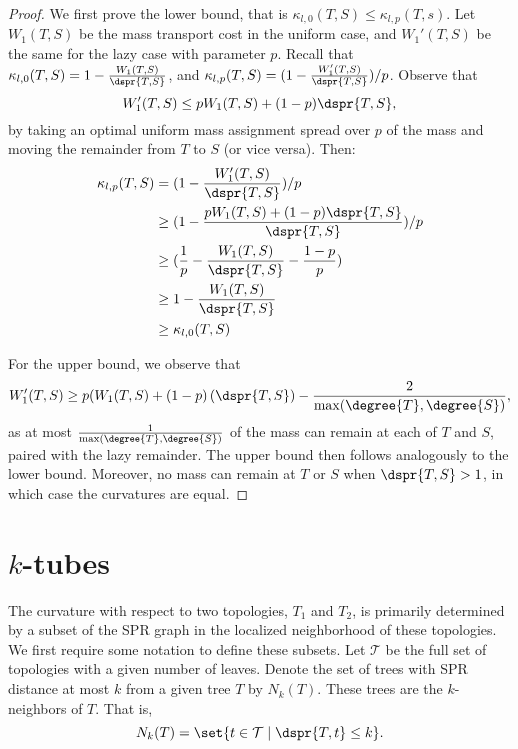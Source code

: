 \documentclass{amsart}
\newcommand{\TT}{\mathcal T}
\begin{document}
\begin{proof}
	We first prove the lower bound, that is $\kappa_{l,0}(T,S) \le \kappa_{l,p}(T,s)$.
	Let $W_1(T,S)$ be the mass transport cost in the uniform case, and $W_1'(T,S)$ be the same for the lazy case with parameter $p$.
	Recall that $\kappa_{l,0}(T,S) = 1 - \frac{W_1(T,S)}{\dspr{T,S}}$, and $\kappa_{l,p}(T,S) = (1 - \frac{W_1'(T,S)}{\dspr{T,S}}) / p$.
	Observe that $$W_1'(T,S) \le pW_1(T,S) + (1-p)\dspr{T,S},$$ by taking an optimal uniform mass assignment spread over $p$ of the mass and moving the remainder from $T$ to $S$ (or vice versa).
	Then:
	\begin{align}
		\kappa_{l,p}(T,S) &= (1 - \frac{W_1'(T,S)}{\dspr{T,S}}) / p \\
		&\ge (1 - \frac{pW_1(T,S) + (1-p)\dspr{T,S}}{\dspr{T,S}}) / p \\
		&\ge (\frac{1}{p} - \frac{W_1(T,S)}{\dspr{T,S}} - \frac{1-p}{p}) \\
		&\ge 1 - \frac{W_1(T,S)}{\dspr{T,S}} \\
		&\ge \kappa_{l,0}(T,S)
	\end{align}

	For the upper bound, we observe that $$W_1'(T,S) \ge p(W_1(T,S) + (1-p)\left(\dspr{T,S}\right) - \frac{2}{\max(\degree{T}, \degree{S})},$$ as at most $\frac{1}{\max(\degree{T},\degree{S})}$ of the mass can remain at each of $T$ and $S$, paired with the lazy remainder.
	The upper bound then follows analogously to the lower bound.
	Moreover, no mass can remain at $T$ or $S$ when $\dspr{T,S} > 1$, in which case the curvatures are equal.
\end{proof}










\section{$k$-tubes}

The curvature with respect to two topologies, $T_1$ and $T_2$, is primarily determined by a subset of the SPR graph in the localized neighborhood of these topologies.
We first require some notation to define these subsets.
Let $\TT$ be the full set of topologies with a given number of leaves.
Denote the set of trees with SPR distance at most $k$ from a given tree $T$ by $N_k(T)$.
These trees are the $k$-neighbors of $T$.
That is, $$ N_k(T) = \set{t \in \TT \mid \dspr{T, t} \le k} .$$
\end{document}
